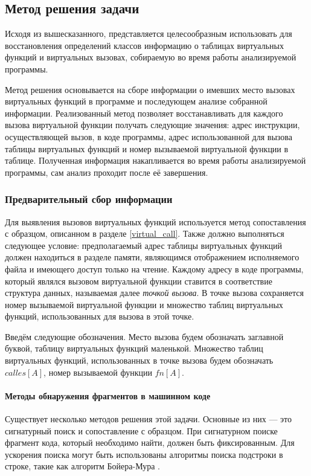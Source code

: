 \documentclass[a4paper,12pt,russian]{article}
\begin{document}
\subsection{Метод решения задачи}
Исходя из вышесказанного, представляется целесообразным использовать для восстановления определений классов информацию о таблицах виртуальных функций и виртуальных вызовах, собираемую во время работы анализируемой программы.

Метод решения основывается на сборе информации о имевших место вызовах виртуальных функций в программе и последующем анализе собранной информации.
Реализованный метод позволяет восстанавливать для каждого вызова виртуальной функции получать следующие значения: адрес инструкции, осуществляющей вызов, в коде программы, адрес использованной для вызова таблицы виртуальных функций и номер вызываемой виртуальной функции в таблице.
Полученная информация накапливается во время работы анализируемой программы, сам анализ проходит после её завершения.

\subsubsection{Предварительный сбор информации}
Для выявления вызовов виртуальных функций используется метод сопоставления с образцом, описанном в разделе \ref{virtual_call}.
Также должно выполняться следующее условие: предполагаемый адрес таблицы виртуальных функций должен находиться в разделе памяти, являющимся отображением исполняемого файла и имеющего доступ только на чтение.
Каждому адресу в коде программы, который являлся вызовом виртуальной функции ставится в соответствие структура данных, называемая далее \emph{точкой вызова}.
В точке вызова сохраняется номер вызываемой виртуальной функции и множество таблиц виртуальных функций, использованных для вызова в этой точке.

Введём следующие обозначения.
Место вызова будем обозначать заглавной буквой, таблицу виртуальных функций маленькой.
Множество таблиц виртуальных функций, использованных в точке вызова будем обозначать $calles[A]$, номер вызываемой функции $fn[A]$.
\paragraph{Методы обнаружения фрагментов в машинном коде}
Существует нес\-колько методов решения этой задачи.
Основные из них --- это сигнатурный поиск и сопоставление с образцом.
При сигнатурном поиске фрагмент кода, который необходимо найти, должен быть фиксированным.
Для ускорения поиска могут быть использованы алгоритмы поиска подстроки в строке, такие как алгоритм Бойера-Мура \cite{corman}.
\end{document}
